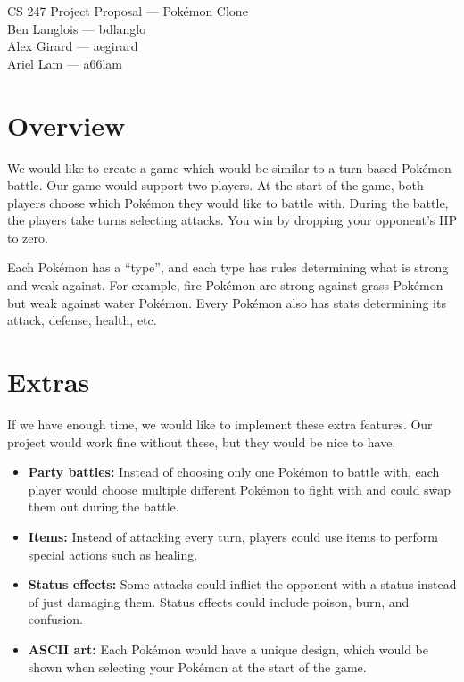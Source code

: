 \documentclass{article}
\begin{document}
\begin{center}
  {\LARGE CS 247 Project Proposal --- Pok\'emon Clone} \\
  \vspace{1em}
  {\large Ben Langlois --- bdlanglo} \\
  {\large Alex Girard --- aegirard} \\
  {\large Ariel Lam --- a66lam}
\end{center}

\section*{Overview}
We would like to create a game which would be similar to a turn-based Pok\'emon battle. Our game would support two players. At the start of the game, both players choose which Pok\'emon they would like to battle with. During the battle, the players take turns selecting attacks. You win by dropping your opponent's HP to zero.

Each Pok\'emon has a ``type'', and each type has rules determining what is strong and weak against. For example, fire Pok\'emon are strong against grass Pok\'emon but weak against water Pok\'emon. Every Pok\'emon also has stats determining its attack, defense, health, etc.

\section*{Extras}
If we have enough time, we would like to implement these extra features. Our project would work fine without these, but they would be nice to have.

\begin{itemize}
  \item \textbf{Party battles:} Instead of choosing only one Pok\'emon to battle with, each player would choose multiple different Pok\'emon to fight with and could swap them out during the battle.

  \item \textbf{Items:} Instead of attacking every turn, players could use items to perform special actions such as healing.

  \item \textbf{Status effects:} Some attacks could inflict the opponent with a status instead of just damaging them. Status effects could include poison, burn, and confusion.

  \item \textbf{ASCII art:} Each Pok\'emon would have a unique design, which would be shown when selecting your Pok\'emon at the start of the game.
\end{itemize}
\end{document}
